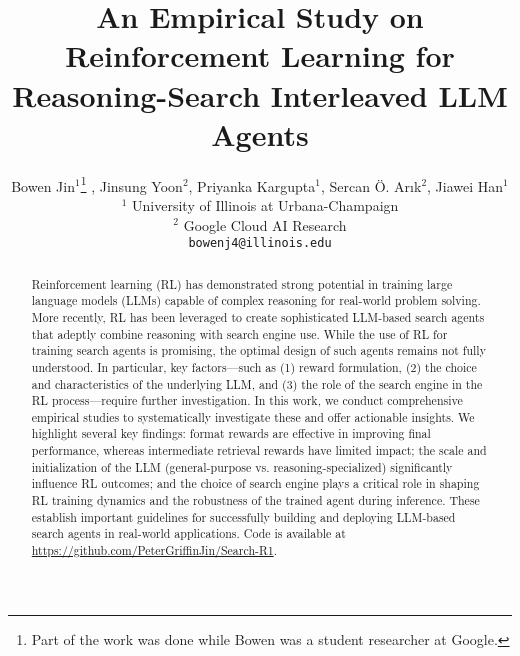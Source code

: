 \title{An Empirical Study on Reinforcement Learning for Reasoning-Search Interleaved LLM Agents}

\author{Bowen Jin$^1$\thanks{Part of the work was done while Bowen was a student researcher at Google.}
, Jinsung Yoon$^2$, Priyanka Kargupta$^1$, Sercan Ö. Arık$^2$, Jiawei Han$^1$ \\
$^1$ University of Illinois at Urbana-Champaign \\
$^2$ Google Cloud AI Research \\

\texttt{bowenj4@illinois.edu} \\
}



\maketitle

\begin{abstract}
Reinforcement learning (RL) has demonstrated strong potential in training large language models (LLMs) capable of complex reasoning for real-world problem solving. 
More recently, RL has been leveraged to create sophisticated LLM-based search agents that adeptly combine reasoning with search engine use.
While the use of RL for training search agents is promising, the optimal design of such agents remains not fully understood. 
In particular, key factors---such as 
(1) reward formulation, 
(2) the choice and characteristics of the underlying LLM, and 
(3) the role of the search engine in the RL process---require further investigation.
In this work, we conduct comprehensive empirical studies to systematically investigate these and offer actionable insights. 
We highlight several key findings: 
format rewards are effective in improving final performance, whereas intermediate retrieval rewards have limited impact; 
the scale and initialization of the LLM (general-purpose vs. reasoning-specialized) significantly influence RL outcomes; 
and the choice of search engine plays a critical role in shaping RL training dynamics and the robustness of the trained agent during inference.
These establish important guidelines for successfully building and deploying LLM-based search agents in real-world applications.
Code is available at \url{https://github.com/PeterGriffinJin/Search-R1}.
\end{abstract}

